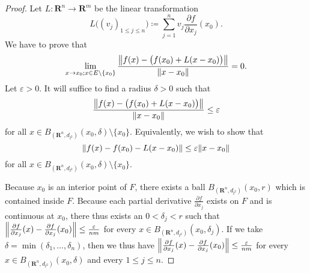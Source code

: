 \begin{proof}
    Let \(L : \mathbf{R}^n \to \mathbf{R}^m\) be the linear transformation
    \[
        L\big((v_j)_{1 \leq j \leq n}\big) \coloneqq \sum_{j = 1}^n v_j \frac{\partial f}{\partial x_j}(x_0).
    \]
    We have to prove that
    \[
        \lim_{x \to x_0 ; x \in E \setminus \{x_0\}} \frac{\norm*{f(x) - \big(f(x_0) + L(x - x_0)\big)}}{\norm*{x - x_0}} = 0.
    \]
    Let \(\varepsilon > 0\).
    It will suffice to find a radius \(\delta > 0\) such that
    \[
        \frac{\norm*{f(x) - \big(f(x_0) + L(x - x_0)\big)}}{\norm*{x - x_0}} \leq \varepsilon
    \]
    for all \(x \in B_{(\mathbf{R}^n, d_{l^2})}(x_0, \delta) \setminus \{x_0\}\).
    Equivalently, we wish to show that
    \[
        \norm*{f(x) - f(x_0) - L(x - x_0)} \leq \varepsilon \norm*{x - x_0}
    \]
    for all \(x \in B_{(\mathbf{R}^n, d_{l^2})}(x_0, \delta) \setminus \{x_0\}\).

    Because \(x_0\) is an interior point of \(F\), there exists a ball \(B_{(\mathbf{R}^n, d_{l^2})}(x_0, r)\) which is contained inside \(F\).
    Because each partial derivative \(\frac{\partial f}{\partial x_j}\) exists on \(F\) and is continuous at \(x_0\), there thus exists an \(0 < \delta_j < r\) such that \(\norm*{\frac{\partial f}{\partial x_j}(x) - \frac{\partial f}{\partial x_j}(x_0)} \leq \frac{\varepsilon}{nm}\) for every \(x \in B_{(\mathbf{R}^n, d_{l^2})}(x_0, \delta_j)\).
    If we take \(\delta = \min(\delta_1, \dots, \delta_n)\), then we thus have \(\norm*{\frac{\partial f}{\partial x_j}(x) - \frac{\partial f}{\partial x_j}(x_0)} \leq \frac{\varepsilon}{nm}\) for every \(x \in B_{(\mathbf{R}^n, d_{l^2})}(x_0, \delta)\) and every \(1 \leq j \leq n\).


\end{proof}
